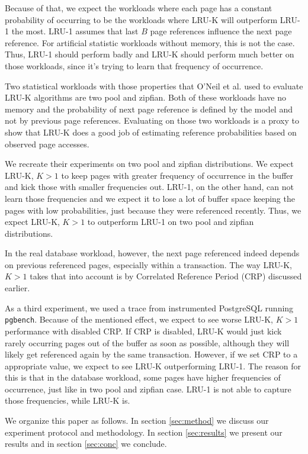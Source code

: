 Because of that, we expect the workloads where each page has a constant probability of occurring to be the workloads where LRU-K will outperform LRU-1 the most. LRU-1 assumes that last $B$ page references influence the next page reference. For artificial statistic workloads without memory, this is not the case. Thus, LRU-1 should perform badly and LRU-K should perform much better on those workloads, since it's trying to learn that frequency of occurrence. 

Two statistical workloads with those properties that O'Neil et al. used to evaluate LRU-K algorithms are two pool and zipfian. Both of these workloads have no memory and the probability of next page reference is defined by the model and not by previous page references. Evaluating on those two workloads is a proxy to show that LRU-K does a good job of estimating reference probabilities based on observed page accesses. 

We recreate their experiments on two pool and zipfian distributions. We expect LRU-K, $K > 1$ to keep pages with greater frequency of occurrence in the buffer and kick those with smaller frequencies out. LRU-1, on the other hand, can not learn those frequencies and we expect it to lose a lot of buffer space keeping the pages with low probabilities, just because they were referenced recently. Thus, we expect LRU-K, $K > 1$ to outperform LRU-1 on two pool and zipfian distributions.

In the real database workload, however, the next page referenced indeed depends on previous referenced pages, especially within a transaction. The way LRU-K, $K > 1$ takes that into account is by Correlated Reference Period (CRP) discussed earlier.

As a third experiment, we used a trace from instrumented PostgreSQL running \texttt{pgbench}. Because of the mentioned effect, we expect to see worse LRU-K, $K > 1$ performance with disabled CRP. If CRP is disabled, LRU-K would just kick rarely occurring pages out of the buffer as soon as possible, although they will likely get referenced again by the same transaction. However, if we set CRP to a appropriate value, we expect to see LRU-K outperforming LRU-1. The reason for this is that in the database workload, some pages have higher frequencies of occurrence, just like in two pool and zipfian case. LRU-1 is not able to capture those frequencies, while LRU-K is.

We organize this paper as follows. In section \ref{sec:method} we discuss our experiment protocol and methodology. In section \ref{sec:results} we present our results and in section \ref{sec:conc} we conclude.